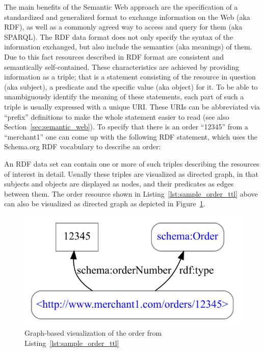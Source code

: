 The main benefits of the Semantic Web approach are the specification of a standardized and generalized format to exchange information on the Web (aka \gls{RDF}), as well as a commonly agreed way to access and query for them (aka \gls{SPARQL}). The \gls{RDF} data format does not only specify the syntax of the information exchanged, but also include the semantics (aka meanings) of them. Due to this fact resources described in \gls{RDF} format are consistent and semantically self-contained. These characteristics are achieved by providing information as a triple; that is a statement consisting of the resource in question (aka subject), a predicate and the specific value (aka object) for it. To be able to unambiguously identify the meaning of these statements, each part of such a triple is usually expressed with a unique \gls{URI}. These \gls{URI}s can be abbreviated via ``prefix'' definitions to make the whole statement easier to read (see also Section~\ref{sec:semantic_web}). To specify that there is an order ``12345'' from a ``merchant1'' one can come up with the following \gls{RDF} statement, which uses the Schema.org \gls{RDF} vocabulary \citep{Schema.org} to describe an order: \@


An \gls{RDF} data set can contain one or more of such triples describing the resources of interest in detail. Usually these triples are visualized as directed graph, in that subjects and objects are displayed as nodes, and their predicates as edges between them. The order resource shown in Listing~\ref{lst:sample_order_ttl} above can also be visualized as directed graph as depicted in Figure~\ref{fig:sample_order_graph_image}. \@

\begin{figure}[H]
  \centering
  \includegraphics[width=0.6\columnwidth]{images/sample_order_12345.pdf}
  \caption{Graph-based visualization of the order from Listing~\ref{lst:sample_order_ttl}}
\label{fig:sample_order_graph_image}
\end{figure}

